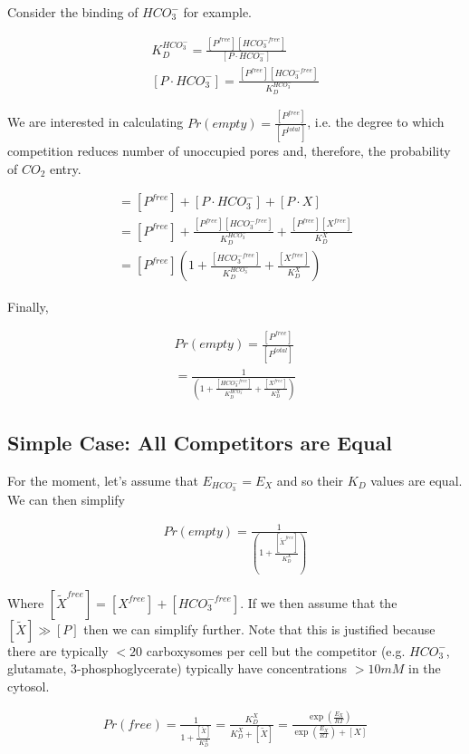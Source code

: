 \documentclass[10pt,a4paper]{article}
\begin{document}
Consider the binding of $HCO_3^-$ for example. 

\begin{align}
K_D^{HCO_3^-} = \frac{[P^{free}][HCO_3^{-free}]}{[P \cdot HCO_3^-]} \\
[P \cdot HCO_3^-] = \frac{[P^{free}][HCO_3^{-free}]}{K_D^{HCO_3^-}}
\end{align}

We are interested in calculating $Pr(empty) = \frac{[P^{free}]}{[P^ 	{total}]}$, i.e. the degree to which competition reduces number of unoccupied pores and, therefore, the probability of $CO_2$ entry. 

\begin{align}
[P^{total}] = [P^{free}] + [P \cdot HCO_3^-] + [P \cdot X] \\
= [P^{free}] + \frac{[P^{free}][HCO_3^{-free}]}{K_D^{HCO_3^-}} + \frac{[P^{free}][X^{free}]}{K_D^{X}}\\
= [P^{free}] \left( 1 + \frac{[HCO_3^{-free}]}{K_D^{HCO_3^-}} + \frac{[X^{free}]}{K_D^{X}}\right)
\end{align}

Finally, 

\begin{align}
Pr(empty) = \frac{[P^{free}]}{[P^{total}]} \\
= \frac{1}{\left( 1 + \frac{[HCO_3^{-free}]}{K_D^{HCO_3^-}} + \frac{[X^{free}]}{K_D^{X}}\right)}
\end{align}

\subsection{Simple Case: All Competitors are Equal}

For the moment, let's assume that $E_{HCO_3^-} = E_{X}$ and so their $K_D$ values are equal. We can then simplify

\begin{align}
Pr(empty) = \frac{1}{\left( 1 + \frac{[\tilde{X}^{free}]}{K_D^{X}}\right)}
\end{align}

Where $[\tilde{X}^{free}] = [{X}^{free}] + [HCO_3^{-free}]$. If we then assume that the $[\tilde{X}] \gg [P]$ then we can simplify further. Note that this is justified because there are typically $ < 20$ carboxysomes per cell but the competitor (e.g. $HCO_3^-$, glutamate, 3-phosphoglycerate) typically have concentrations $> 10 mM$ in the cytosol.

\begin{align}
Pr(free) = \frac{1}{1 + \frac{[\tilde{X}]}{K_D^{X}}} = \frac{K_D^{X}}{K_D^{X} + [\tilde{X}]} = \frac{\exp\left(\frac{E_X}{RT} \right)}{\exp\left(\frac{E_X}{RT} \right) + [X]}
\end{align}
\end{document}
